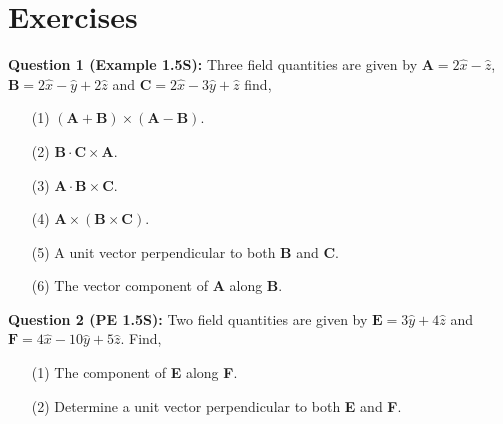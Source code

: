 \documentclass[12pt,a4paper]{article}
\begin{document}
\section{Exercises}
\noindent\textbf{Question 1 (Example 1.5S):} Three field quantities are given by $\textbf{A}=2\hat x-\hat z$, $\textbf{B}=2\hat x-\hat y+2\hat z$ and $\textbf{C}=2\hat x-3\hat y+\hat z$ find,
\begin{enumerate}
\item[(1)] $(\textbf{A}+\textbf{B})\times(\textbf{A}-\textbf{B})$.
\item[(2)] $\textbf{B}\cdot \textbf{C}\times \textbf{A}$.
\item[(3)] $\textbf{A}\cdot \textbf{B}\times \textbf{C}$.
\item[(4)] $\textbf{A}\times(\textbf{B}\times \textbf{C})$.
\item[(5)] A unit vector perpendicular to both \textbf{B} and \textbf{C}.
\item[(6)] The vector component of \textbf{A} along \textbf{B}.
\end{enumerate}
\noindent\textbf{Question 2 (PE 1.5S):} Two field quantities are given by $\textbf{E}=3\hat y+4\hat z$ and $\textbf{F}=4\hat x-10\hat y+5\hat z$. Find,
\begin{enumerate}
\item[(1)] The component of \textbf{E} along \textbf{F}.
\item[(2)] Determine a unit vector perpendicular to both \textbf{E} and \textbf{F}.
\end{enumerate}


\end{document}

